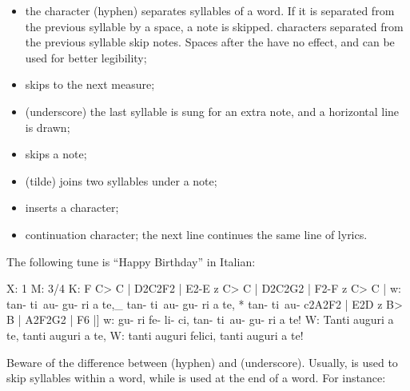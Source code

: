 \documentclass[a4paper,12pt]{book}
\begin{document}
\begin{itemize}
  
  \item the \car{-} character (hyphen) separates syllables of a word.
  If it is separated from the previous syllable by a space, a note is
  skipped.  \car{-} characters separated from the previous
  syllable skip  notes. Spaces after the \car{-} have no
  effect, and can be used for better legibility;
  
  \item \car{\textbar} skips to the next measure;
  
  \item \car{\_} (underscore) the last syllable is sung for an extra
  note, and a horizontal line is drawn;
  
  \item \car{*} skips a note;
  
  \item \car{\textasciitilde} (tilde) joins two syllables under a note;
  
  \item \car{\bl{}-} inserts a \car{-} character;
  
  \item \car{\textbackslash} continuation character; the next 
  line continues the same line of lyrics.
  
\end{itemize}

The following tune is ``Happy Birthday'' in Italian:

\begin{abcsource}
X: 1
M: 3/4
K: F
C> C | D2C2F2 | E2-E z C> C | D2C2G2 | F2-F z C> C |
w: tan- ti~au- gu- ri a te,_ tan- ti~au- gu- ri a te, * tan- ti~au-
c2A2F2 | E2D z B> B | A2F2G2 | F6 |]
w: gu- ri fe- li- ci, tan- ti~au- gu- ri a te!
%
W: Tanti auguri a te, tanti auguri a te,
W: tanti auguri felici, tanti auguri a te!
\end{abcsource}



Beware of the difference between \car{-} (hyphen) and \car{\_}
(underscore). Usually, \car{-} is used to skip syllables within a
word, while \car{\_} is used at the end of a word. For instance:
\end{document}
